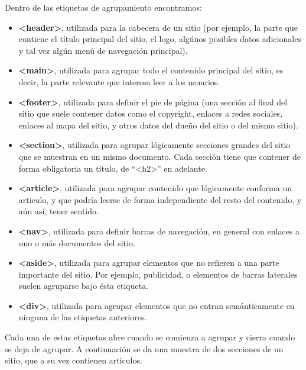 Dentro de las etiquetas de agrupamiento encontramos:
\begin{itemize}
    \item \textbf{<header>}, utilizada para la cabecera de un sitio (por ejemplo,
        la parte que contiene el título principal del sitio, el logo, algúnos posibles
        datos adicionales y tal vez algún menú de navegación principal).
    \item \textbf{<main>}, utilizada para agrupar todo el contenido principal del
        sitio, es decir, la parte relevante que interesa leer a los usuarios.
    \item \textbf{<footer>}, utilizada para definir el pie de página (una sección
        al final del sitio que suele contener datos como el copyright, enlaces
        a redes sociales, enlaces al mapa del sitio, y otros datos del dueño
        del sitio o del mismo sitio).
    \item \textbf{<section>}, utilizada para agrupar lógicamente secciones
        grandes del sitio que se muestran en un mismo documento. Cada sección
        tiene que contener de forma obligatoria un título, de ``<h2>'' en adelante.
    \item \textbf{<article>}, utilizada para agrupar contenido que lógicamente
        conforma un articulo, y que podría leerse de forma independiente del
        resto del contenido, y aún así, tener sentido.
    \item \textbf{<nav>}, utilizada para definir barras de navegación, en general
        con enlaces a uno o más documentos del sitio.
    \item \textbf{<aside>}, utilizada para agrupar elementos que no refieren a una
        parte importante del sitio. Por ejemplo, publicidad, o elementos de barras
        laterales suelen agruparse bajo ésta etiqueta.
    \item \textbf{<div>}, utilizada para agrupar elementos que no entran
        semánticamente en ninguna de las etiquetas anteriores.
\end{itemize}

Cada una de estas etiquetas abre cuando se comienza a agrupar y cierra cuando
se deja de agrupar. A continuación se da una muestra de dos secciones de un sitio,
que a su vez contienen articulos.

